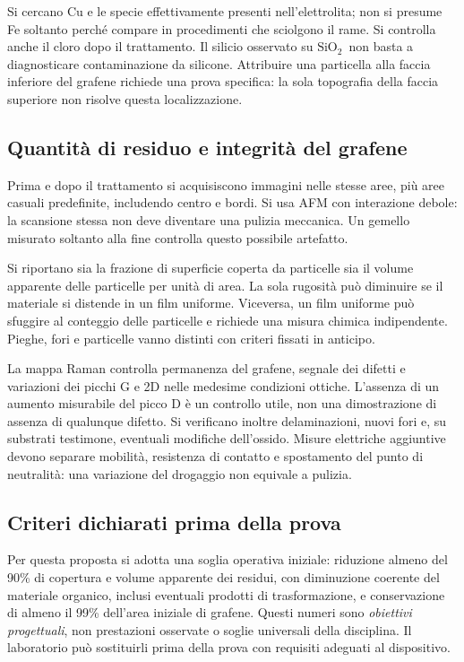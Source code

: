 \documentclass[11pt,reqno]{amsart}
\numberwithin{equation}{section}
\newcommand{\SiO}{\ensuremath{\mathrm{SiO}_2}}
\begin{document}
Si cercano Cu e le specie effettivamente presenti nell'elettrolita;
non si presume Fe soltanto perch\'e compare in procedimenti che
sciolgono il rame. Si controlla anche il cloro dopo il trattamento.
Il silicio osservato su \SiO\ non basta a diagnosticare contaminazione
da silicone. Attribuire una particella alla faccia inferiore del grafene
richiede una prova specifica: la sola topografia della faccia superiore
non risolve questa localizzazione.

\subsection{Quantit\`a di residuo e integrit\`a del grafene}
Prima e dopo il trattamento si acquisiscono immagini nelle stesse
aree, pi\`u aree casuali predefinite, includendo centro e bordi. Si usa
AFM con interazione debole: la scansione stessa non deve diventare
una pulizia meccanica. Un gemello misurato soltanto alla fine controlla
questo possibile artefatto.

Si riportano sia la frazione di superficie coperta da particelle sia
il volume apparente delle particelle per unit\`a di area. La sola
rugosit\`a pu\`o diminuire se il materiale si distende in un film
uniforme. Viceversa, un film uniforme pu\`o sfuggire al conteggio
delle particelle e richiede una misura chimica indipendente.
Pieghe, fori e particelle vanno distinti con criteri fissati in anticipo.

La mappa Raman controlla permanenza del grafene, segnale dei difetti
e variazioni dei picchi G e 2D nelle medesime condizioni ottiche.
L'assenza di un aumento misurabile del picco D \`e un controllo utile,
non una dimostrazione di assenza di qualunque difetto.
Si verificano inoltre delaminazioni, nuovi fori e, su substrati testimone,
eventuali modifiche dell'ossido. Misure elettriche aggiuntive devono
separare mobilit\`a, resistenza di contatto e spostamento del punto
di neutralit\`a: una variazione del drogaggio non equivale a pulizia.

\subsection{Criteri dichiarati prima della prova}
Per questa proposta si adotta una soglia operativa iniziale:
riduzione almeno del 90\% di copertura e volume apparente dei residui,
con diminuzione coerente del materiale organico, inclusi eventuali
prodotti di trasformazione, e conservazione di
almeno il 99\% dell'area iniziale di grafene. Questi numeri sono
\emph{obiettivi progettuali}, non prestazioni osservate o soglie
universali della disciplina. Il laboratorio pu\`o sostituirli prima
della prova con requisiti adeguati al dispositivo.
\end{document}
